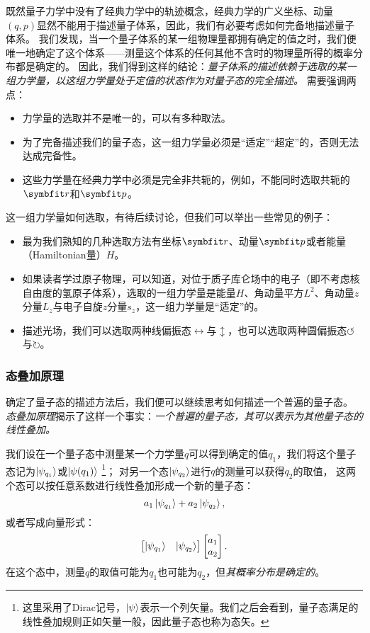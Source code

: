 既然量子力学中没有了经典力学中的轨迹概念，经典力学的广义坐标、动量$(q,p)$显然不能用于描述量子体系，因此，我们有必要考虑如何完备地描述量子体系。
我们发现，当一个量子体系的某一组物理量都拥有确定的值之时，我们便唯一地确定了这个体系——测量这个体系的任何其他不含时的物理量所得的概率分布都是确定的。
因此，我们得到这样的结论：\emph{量子体系的描述依赖于选取的某一组力学量，以这组力学量处于定值的状态作为对量子态的完全描述。}
需要强调两点：
\begin{itemize}
    \item{力学量的选取并不是唯一的，可以有多种取法。}
    \item{为了完备描述我们的量子态，这一组力学量必须是“适定”“超定”的，否则无法达成完备性。}
    \item{这些力学量在经典力学中必须是完全非共轭的，例如，不能同时选取共轭的$\rr$和$\pp$。}
\end{itemize}
这一组力学量如何选取，有待后续讨论，但我们可以举出一些常见的例子：
\begin{itemize}
    \item{最为我们熟知的几种选取方法有坐标$\rr$、动量$\pp$或者能量（Hamiltonian量）$H$。}
    \item{如果读者学过原子物理，可以知道，对位于质子库仑场中的电子（即不考虑核自由度的氢原子体系），选取的一组力学量是能量$H$、角动量平方$L^2$、角动量$z$分量$L_z$与电子自旋$z$分量$s_z$，这一组力学量是“适定”的。}
    \item{描述光场，我们可以选取两种线偏振态$\leftrightarrow$与$\updownarrow$，也可以选取两种圆偏振态$\circlearrowleft$与$\circlearrowright$。}
\end{itemize}


\subsubsection{态叠加原理}

确定了量子态的描述方法后，我们便可以继续思考如何描述一个普遍的量子态。
\emph{态叠加原理}揭示了这样一个事实：\emph{一个普遍的量子态，其可以表示为其他量子态的线性叠加。}

我们设在一个量子态中测量某一个力学量$q$可以得到确定的值$q_1$，我们将这个量子态记为$\ket{\psi_{q_1}}$或$\ket{\psi(q_1)}$
\footnote{这里采用了Dirac记号，$\ket{\psi}$表示一个列矢量。我们之后会看到，量子态满足的线性叠加规则正如矢量一般，因此量子态也称为态矢。}；
对另一个态$\ket{\psi_{q_2}}$进行$q$的测量可以获得$q_2$的取值，
这两个态可以按任意系数进行线性叠加形成一个新的量子态：
\begin{equation}
    \label{eq:principles_superposition_discrete}
    a_1 \ket{\psi_{q_1}} + a_2 \ket{\psi_{q_2}},
\end{equation}
或者写成向量形式：
\begin{equation}
    \begin{bmatrix}
        \ket{\psi_{q_1}} & \ket{\psi_{q_2}}
    \end{bmatrix}
    \begin{bmatrix}
        a_1 \\ a_2
    \end{bmatrix}.
\end{equation}
在这个态中，测量$q$的取值可能为$q_1$也可能为$q_2$，但\emph{其概率分布是确定的}。

